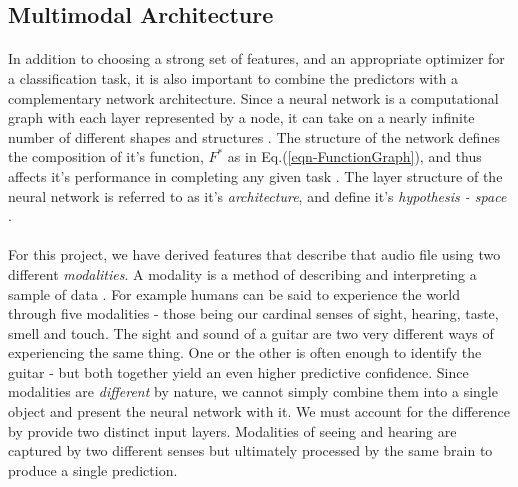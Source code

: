 \documentclass[12pt,letterpaper]{article}
\begin{document}

\subsection{Multimodal Architecture}
\label{subsec-Architecture}

\paragraph*{}In addition to choosing a strong set of features, and an appropriate optimizer for a classification task, it is also important to combine the predictors with a complementary network architecture. Since a neural network is a computational graph with each layer represented by a node, it can take on a nearly infinite number of different shapes and structures \cite{Goodfellow,Virtanen}. The structure of the network defines the composition of it's function, $F^*$ as in Eq.(\ref{eqn-FunctionGraph}), and thus affects it's performance in completing any given task \cite{Geron}. The layer structure of the neural network is referred to as it's \textit{architecture}, and define it's \textit{hypothesis - space} \cite{Goodfellow}. 

\paragraph*{}For this project, we have derived features that describe that audio file using two different \textit{modalities}. A modality is a method of describing and interpreting a sample of data \cite{Ngiam}. For example humans can be said to experience the world through five modalities - those being our cardinal senses of sight, hearing, taste, smell and touch. The sight and sound of a guitar are two very different ways of experiencing the same thing. One or the other is often enough to identify the guitar - but both together yield an even higher predictive confidence. Since modalities are \textit{different} by nature, we cannot simply combine them into a single object and present the neural network with it. We must account for the difference by provide two distinct input layers.  Modalities of seeing and hearing are captured by two different senses but ultimately processed by the same brain to produce a single prediction.
\end{document}
